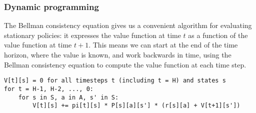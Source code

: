 \documentclass[../main/main]{subfiles}
\begin{document}
\subsubsection{Dynamic programming}

The Bellman consistency equation gives us a convenient algorithm for evaluating stationary policies: it expresses the value function at time $t$ as a function of the value function at time $t+1$. This means we can start at the end of the time horizon, where the value is known, and work backwards in time, using the Bellman consistency equation to compute the value function at each time step.

\begin{lstlisting}
V[t][s] = 0 for all timesteps t (including t = H) and states s
for t = H-1, H-2, ..., 0:
    for s in S, a in A, s' in S:
        V[t][s] += pi[t][s] * P[s][a][s'] * (r[s][a] + V[t+1][s'])
\end{lstlisting}
\end{document}
